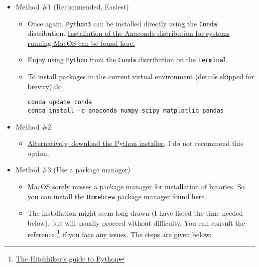 \documentclass[11pt]{article}
\begin{document}
\begin{itemize}
\item Method \#1 (Recommended, Easiest)
\label{sec:org47ba300}
\begin{itemize}
\item Once again, \texttt{Python3} can be installed directly using the \texttt{Conda} distribution. \href{https://www.anaconda.com/download/\#macos}{Installation of the Anaconda distribution for systems running MacOS can be found here.}
\item Enjoy using \texttt{Python} from the \texttt{Conda} distribution on the \texttt{Terminal}.
\item To install packages in the current virtual environment (details skipped for
brevity) do
\begin{verbatim}
conda update conda
conda install -c anaconda numpy scipy matplotlib pandas
\end{verbatim}
\end{itemize}

\item Method \#2
\label{sec:orgd58bab8}
\begin{itemize}
\item \href{https://www.python.org/downloads/mac-osx/}{Alternatively, download the Python installer}. I do not recommend this
option.
\end{itemize}

\item Method \#3 (Use a package manager)
\label{sec:org63d46c1}
\begin{itemize}
\item MacOS sorely misses a package manager for installation of binaries. So you
can install the \texttt{Homebrew} package manager found \href{https://brew.sh/}{here}.
\item The installation might seem long drawn (I have listed the time needed
below), but will usually proceed without difficulty. You can consult the
reference \footnote{\href{https://docs.python-guide.org/starting/install3/osx/}{The Hitchhiker's guide to Python}} if you face any issues. The steps are given below:


\end{itemize}
\end{itemize}
\end{document}
